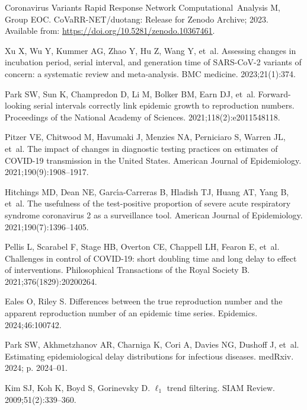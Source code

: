 \documentclass[10pt,letterpaper]{article}
\begin{document}
\begin{thebibliography}{10}
  Coronavirus Variants Rapid Response Network Computational~Analysis M, Group
    EOC. CoVaRR-NET/duotang: Release for Zenodo Archive; 2023.
  \newblock Available from: \url{https://doi.org/10.5281/zenodo.10367461}.
  
  Xu X, Wu Y, Kummer AG, Zhao Y, Hu Z, Wang Y, et~al.
  \newblock Assessing changes in incubation period, serial interval, and
    generation time of SARS-CoV-2 variants of concern: a systematic review and
    meta-analysis.
  \newblock BMC medicine. 2023;21(1):374.
  
  Park SW, Sun K, Champredon D, Li M, Bolker BM, Earn DJ, et~al.
  \newblock Forward-looking serial intervals correctly link epidemic growth to
    reproduction numbers.
  \newblock Proceedings of the National Academy of Sciences.
    2021;118(2):e2011548118.
  
  Pitzer VE, Chitwood M, Havumaki J, Menzies NA, Perniciaro S, Warren JL, et~al.
  \newblock The impact of changes in diagnostic testing practices on estimates of
    {COVID-19} transmission in the {U}nited {S}tates.
  \newblock American Journal of Epidemiology. 2021;190(9):1908--1917.
  
  Hitchings MD, Dean NE, Garc{\'\i}a-Carreras B, Hladish TJ, Huang AT, Yang B,
    et~al.
  \newblock The usefulness of the test-positive proportion of severe acute
    respiratory syndrome coronavirus 2 as a surveillance tool.
  \newblock American Journal of Epidemiology. 2021;190(7):1396--1405.
  
  Pellis L, Scarabel F, Stage HB, Overton CE, Chappell LH, Fearon E, et~al.
  \newblock Challenges in control of {COVID-19}: short doubling time and long
    delay to effect of interventions.
  \newblock Philosophical Transactions of the Royal Society B.
    2021;376(1829):20200264.
  
  Eales O, Riley S.
  \newblock Differences between the true reproduction number and the apparent
    reproduction number of an epidemic time series.
  \newblock Epidemics. 2024;46:100742.
  
  Park SW, Akhmetzhanov AR, Charniga K, Cori A, Davies NG, Dushoff J, et~al.
  \newblock Estimating epidemiological delay distributions for infectious
    diseases.
  \newblock medRxiv. 2024; p. 2024--01.
  
  Kim SJ, Koh K, Boyd S, Gorinevsky D.
  \newblock $\ell_1$ trend filtering.
  \newblock SIAM Review. 2009;51(2):339--360.
  

\end{thebibliography}
\end{document}
